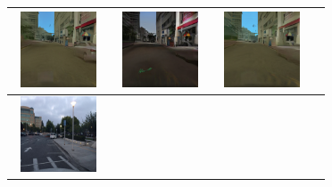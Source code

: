 \documentclass{VUMIFPSbakalaurinis}
\begin{document}
\begin{table}[H]
{\begin{tabular}{|c|c|c|c|}
            \includegraphics[width=100,height=85]{img/pvz/6_cycle} & \includegraphics[width=100,height=85]{img/pvz/6_cut} & \includegraphics[width=100,height=85]{img/pvz/6_mspc}
            \\
            \hline
            \includegraphics[width=100,height=85]{img/pvz/7_real} & 

\end{tabular}}
\end{table}
\end{document}
